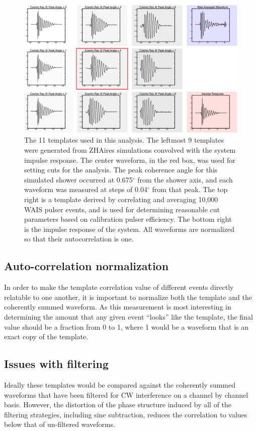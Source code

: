 \begin{figure}
	\centering
	\includegraphics[width=\textwidth]{figures/templates}
	\caption{The 11 templates used in this analysis.  The leftmost 9 templates were generated from ZHAires simulations convolved with the system impulse response. The center waveform, in the red box, was used for setting cuts for the analysis.  The peak coherence angle for this simulated shower occurred at 0.675$^{\circ}$ from the shower axis, and each waveform was measured at steps of 0.04$^{\circ}$ from that peak.  The top right is a template derived by correlating and averaging 10,000 WAIS pulser events, and is used for determining reasonable cut parameters based on calibration pulser efficiency.  The bottom right is the impulse response of the system.  All waveforms are normalized so that their autocorrelation is one.} 
	\label{fig:templates}
\end{figure}		
		
		
	
	\subsection{Auto-correlation normalization}
		In order to make the template correlation value of different events directly relatable to one another, it is important to normalize both the template and the coherently summed waveform.  As this measurement is most interesting in determining the amount that any given event ``looks'' like the template, the final value should be a fraction from 0 to 1, where 1 would be a waveform that is an exact copy of the template.

	\subsection{Issues with filtering}
		Ideally these templates would be compared against the coherently summed waveforms that have been filtered for CW interference on a channel by channel basis.  However, the distortion of the phase structure induced by all of the filtering strategies, including sine subtraction, reduces the correlation to values below that of un-filtered waveforms.  

